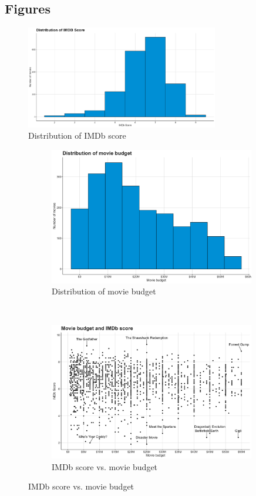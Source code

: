 \documentclass[12pt,a4paper]{article}
\begin{document}
\clearpage

\begin{appendices}
    \section{Figures}\label{app:figures}

    \begin{figure}[h]
        \centering
        \includegraphics[width=0.75\textwidth]{imdb_score.png}
        \caption{Distribution of IMDb score}
        \label{fig:imdb-score-hist}
    \end{figure}

    \begin{figure}[h]
        \begin{subfigure}[t]{0.5\textwidth}
            \includegraphics[width=0.95\linewidth, height=6cm]{movie_budget.png}
            \caption{Distribution of movie budget}
            \label{fig:budget-hist}
        \end{subfigure}
        ~
        \begin{subfigure}[t]{0.5\textwidth}
            \includegraphics[width=0.95\linewidth, height=6cm]{movie_budget_imdb_score.png}
            \caption{IMDb score vs. movie budget}
            \label{fig:budget-imdb-scatter}
        \end{subfigure}


\end{figure}
\end{appendices}
\end{document}
